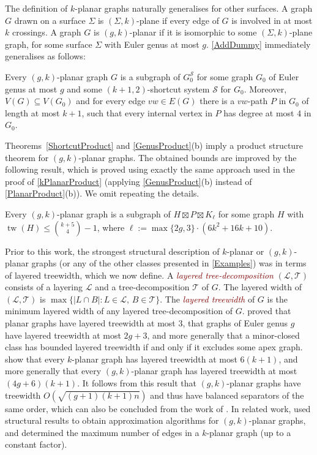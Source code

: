 \documentclass{patmorin}
\newcommand{\defin}[1]{\textcolor{Maroon}{\emph{#1}}}
\DeclareMathOperator{\tw}{tw}
\renewcommand{\SS}{\mathcal{S}}
\renewcommand{\leq}{\leqslant}
\begin{document}
The definition of $k$-planar graphs naturally generalises for other surfaces. A graph $G$ drawn on a surface $\Sigma$ is $(\Sigma,k)$-plane if every edge of $G$ is involved in at most $k$ crossings.  A graph $G$ is $(g,k)$-planar if it is isomorphic to some $(\Sigma,k)$-plane graph, for some surface $\Sigma$ with Euler genus at most $g$. \cref{AddDummy} immediately generalises as follows:

\begin{obs}
\label{gAddDummy}
Every $(g,k)$-planar graph $G$ is a subgraph of $G_0^\SS$ for some graph $G_0$ of Euler genus at most $g$ and some $(k+1,2)$-shortcut system $\SS$ for $G_0$. Moreover, $V(G) \subseteq V(G_0)$ and for every edge $vw \in E(G)$ there is a $vw$-path $P$ in $G_0$ of length at most $k+1$, such that every internal vertex in $P$ has degree at most $4$ in $G_0$.
\end{obs}

Theorems~\ref{ShortcutProduct}  and \ref{GenusProduct}(b) imply a product structure theorem for $(g,k)$-planar graphs. The obtained bounds are improved by the following result, which is proved using exactly the same approach used in the proof of \cref{kPlanarProduct} (applying \cref{GenusProduct}(b) instead of \cref{PlanarProduct}(b)). We omit repeating the details.

\begin{thm}
\label{gkPlanarProduct}
Every $(g,k)$-planar graph is a subgraph of $H\boxtimes P \boxtimes K_\ell$ for some graph $H$ with $\tw(H) \leq \binom{k+5}{4}-1$, where $\ell:=\max\{2g,3\}\cdot(6k^2+16k+10)$.
\end{thm}

Prior to this work, the strongest structural description of $k$-planar or $(g,k)$-planar graphs (or any of the other classes presented in \cref{Examples}) was in terms of layered treewidth, which we now define.  A \defin{layered tree-decomposition} $(\mathcal{L},\mathcal{T})$ consists of a layering $\mathcal{L}$ and a tree-decomposition $\mathcal{T}$ of $G$. The layered width of $(\mathcal{L},\mathcal{T})$ is $\max\{|L\cap B|: L\in \mathcal{L},\, B\in \mathcal{T}\}$.  The \defin{layered treewidth} of $G$ is the minimum layered width of any layered tree-decomposition of $G$. \citet{dujmovic.morin.ea:layered} proved that planar graphs have layered treewidth at most 3, that graphs of Euler genus $g$ have layered treewidth at most $2g+3$, and more generally that a minor-closed class has bounded layered treewidth if and only if it excludes some apex graph. \citet{dujmovic.eppstein.ea:structure} show that every $k$-planar graph has layered treewidth at most $6(k+1)$, and more generally that every $(g,k)$-planar graph has layered treewidth at most $(4g+6)(k+1)$. It follows from this result that $(g,k)$-planar graphs have treewidth $O(\sqrt{(g+1)(k+1)n})$ and thus have balanced separators of the same order, which can also be concluded from the work of \citet{FP08}. In related work, \citet{grigoriev.bodlaender:algorithms} used structural results to obtain approximation algorithms for $(g,k)$-planar graphs, and \citet{PachToth97} determined the maximum number of edges in a $k$-planar graph (up to a constant factor).
\end{document}
